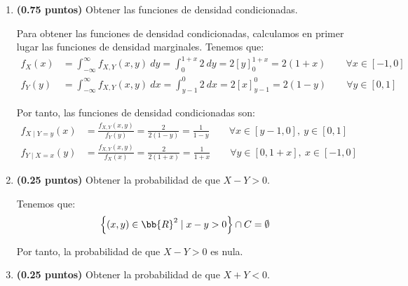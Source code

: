 \documentclass[12pt]{article}
\begin{document}
\begin{ejercicio}[5 puntos]
\begin{enumerate}
            
            \item \textbf{(0.75 puntos)} Obtener las funciones de densidad condicionadas.
            
            Para obtener las funciones de densidad condicionadas, calculamos en primer lugar las funciones de densidad marginales. Tenemos que:
            \begin{align*}
                f_X(x) &= \int_{-\infty}^{\infty} f_{X,Y}(x,y) \ dy
                = \int_{0}^{1+x} 2 \ dy = 2\left[y\right]_{0}^{1+x} = 2(1+x) \qquad \forall x\in \left[-1,0\right] \\
                f_Y(y) &= \int_{-\infty}^{\infty} f_{X,Y}(x,y) \ dx
                = \int_{y-1}^{0} 2 \ dx = 2\left[x\right]_{y-1}^{0} = 2(1-y) \qquad \forall y\in \left[0,1\right]
            \end{align*}

            Por tanto, las funciones de densidad condicionadas son:
            \begin{align*}
                f_{X\mid Y=y}(x) &= \frac{f_{X,Y}(x,y)}{f_Y(y)} = \frac{2}{2(1-y)} = \frac{1}{1-y} \qquad \forall x\in \left[y-1,0\right], \ y\in \left[0,1\right] \\
                f_{Y\mid X=x}(y) &= \frac{f_{X,Y}(x,y)}{f_X(x)} = \frac{2}{2(1+x)} = \frac{1}{1+x} \qquad \forall y\in \left[0,1+x\right], \ x\in \left[-1,0\right]
            \end{align*}
            \item \textbf{(0.25 puntos)} Obtener la probabilidad de que $X-Y > 0$.
            
            Tenemos que:
            \begin{equation*}
                \left\{(x,y)\in \bb{R}^2 \mid x-y>0\right\}\cap C=\emptyset
            \end{equation*}

            Por tanto, la probabilidad de que $X-Y>0$ es nula.
            \item \textbf{(0.25 puntos)} Obtener la probabilidad de que $X+Y < 0$.
            

\end{enumerate}
\end{ejercicio}
\end{document}
